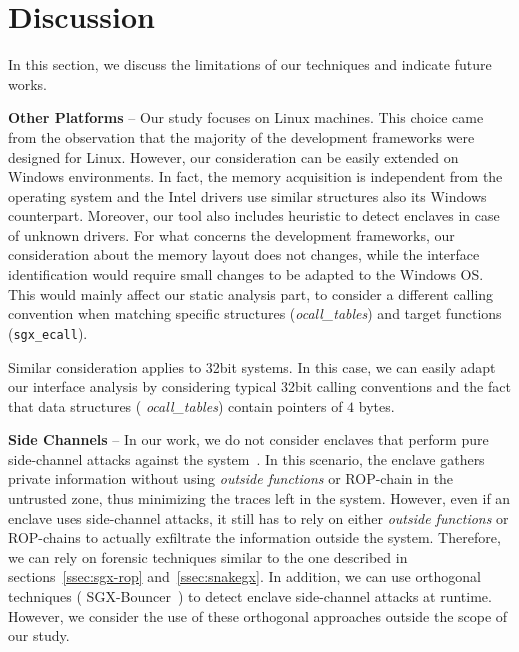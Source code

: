 \section{Discussion}
\label{sec:discussion}

In this section, we discuss the limitations of our techniques and indicate 
future works.

\vspace{0.2cm}
\noindent \textbf{Other Platforms} --
Our study focuses on Linux machines. This choice came from the observation 
that the majority of the development frameworks were designed for Linux.
However, our consideration can be easily extended on Windows environments.
In fact, the memory acquisition is independent from the operating system and
the 
Intel drivers use similar structures also its Windows counterpart.
Moreover, our tool also includes heuristic to detect enclaves in case of 
unknown drivers.
For what concerns the development frameworks, our consideration about the 
memory layout does not changes, while the interface identification would 
require 
small changes to be adapted to the Windows OS. This would mainly 
affect our static analysis part, to consider a different 
calling convention when matching specific structures (\eg \emph{ocall\_tables}) 
and target functions (\eg \texttt{sgx\_ecall}).

Similar consideration applies to 32bit systems.
In this case, we 
can easily adapt our interface analysis by considering typical 32bit calling 
conventions
and the fact that data structures (\eg 
\emph{ocall\_tables}) contain pointers of $4$ bytes.

\vspace{0.2cm} \noindent \textbf{Side Channels} -- In our work, we do not
consider enclaves that perform pure side-channel attacks against the
system~\citep{sgxsidechannel}. In this scenario, the enclave gathers private
information without using \emph{outside functions} or ROP-chain in the
untrusted zone, thus minimizing the traces left in the system. However,
even if an enclave uses side-channel attacks, it still has to rely on
either \emph{outside functions} or ROP-chains to actually exfiltrate the
information outside the system. Therefore, we can rely on forensic
techniques similar to the one described in sections~\ref{ssec:sgx-rop}
and~\ref{ssec:snakegx}. In addition, we can use orthogonal techniques (\ie
SGX-Bouncer~\cite{zhang2021see}) to detect enclave side-channel attacks at
runtime. However, we consider the use of these orthogonal approaches outside
the scope of our study.

